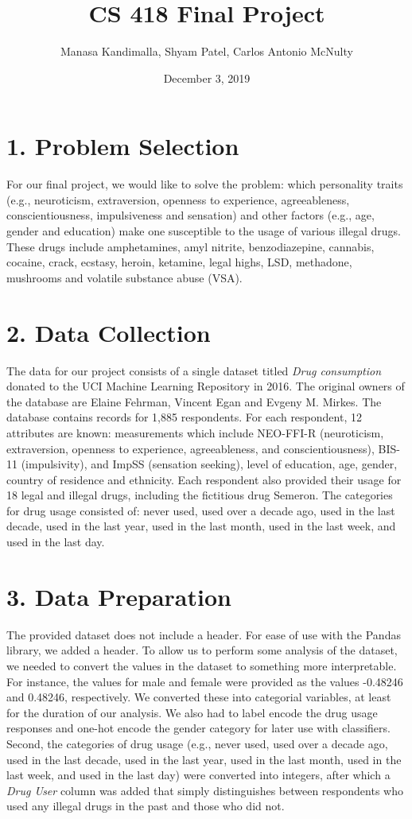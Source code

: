\documentclass[10pt]{article}
\title{CS 418 Final Project}
\date{December 3, 2019}
\author {Manasa Kandimalla, Shyam Patel, Carlos Antonio McNulty}
\begin{document}
\maketitle

\section*{1. Problem Selection}

For our final project, we would like to solve the problem: which personality traits (e.g., neuroticism, extraversion, openness to experience, agreeableness, conscientiousness, impulsiveness and sensation) and other factors (e.g., age, gender and education) make one susceptible to the usage of various illegal drugs. These drugs include amphetamines, amyl nitrite, benzodiazepine, cannabis, cocaine, crack, ecstasy, heroin, ketamine, legal highs, LSD, methadone, mushrooms and volatile substance abuse (VSA).


\section*{2. Data Collection}

The data for our project consists of a single dataset titled \textit{Drug consumption} donated to the UCI Machine Learning Repository in 2016. The original owners of the database are Elaine Fehrman, Vincent Egan and Evgeny M. Mirkes. The database contains records for 1,885 respondents. For each respondent, 12 attributes are known: measurements which include NEO-FFI-R (neuroticism, extraversion, openness to experience, agreeableness, and conscientiousness), BIS-11 (impulsivity), and ImpSS (sensation seeking), level of education, age, gender, country of residence and ethnicity. Each respondent also provided their usage for 18 legal and illegal drugs, including the fictitious drug Semeron. The categories for drug usage consisted of: never used, used over a decade ago, used in the last decade, used in the last year, used in the last month, used in the last week, and used in the last day.

\section*{3. Data Preparation}

The provided dataset does not include a header. For ease of use with the Pandas library, we added a header. To allow us to perform some analysis of the dataset, we needed to convert the values in the dataset to something more interpretable. For instance, the values for male and female were provided as the values -0.48246 and 0.48246, respectively. We converted these into categorial variables, at least for the duration of our analysis. We also had to label encode the drug usage responses and one-hot encode the gender category for later use with classifiers. Second, the categories of drug usage (e.g., never used, used over a decade ago, used in the last decade, used in the last year, used in the last month, used in the last week, and used in the last day) were converted into integers, after which a \textit{Drug User} column was added that simply distinguishes between respondents who used any illegal drugs in the past and those who did not.
\end{document}
